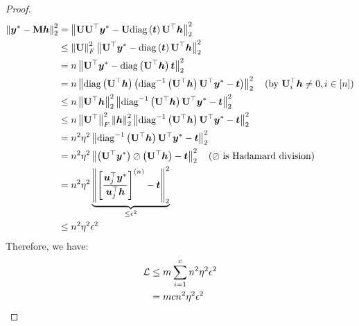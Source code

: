 \documentclass{article} %
\begin{document}
\begin{proof}
		\begin{equation}
			\begin{aligned}
				\left\|{\bm{y}}^*-{\mathbf{M}}{\bm{h}}\right\|^2_2&=\left\|{\mathbf{U}}{\mathbf{U}}^{\top}{\bm{y}}^*-{\mathbf{U}}\mathrm{diag}\left({\bm{t}}\right){\mathbf{U}}^{\top}{\bm{h}}\right\|_2^2\\
				&\leq\left\|{\mathbf{U}}\right\|_F^2\left\|{\mathbf{U}}^{\top}{\bm{y}}^*-\mathrm{diag}\left({\bm{t}}\right){\mathbf{U}}^{\top}{\bm{h}}\right\|_2^2\\
				&=n\left\|{\mathbf{U}}^{\top}{\bm{y}}^*-\mathrm{diag}\left({\mathbf{U}}^{\top}{\bm{h}}\right){\bm{t}}\right\|_2^2\\
				&=n\left\|\mathrm{diag}\left({\mathbf{U}}^{\top}{\bm{h}}\right)\left(\mathrm{diag}^{-1}\left({\mathbf{U}}^{\top}{\bm{h}}\right){\mathbf{U}}^{\top}{\bm{y}}^*-{\bm{t}}\right)\right\|_2^2\quad\textrm{(by ${\mathbf{U}}_i^{\top}{\bm{h}}\neq 0,i\in[n])$}\\
				&\leq n\left\|{\mathbf{U}}^{\top}{\bm{h}}\right\|_2^2\left\|\mathrm{diag}^{-1}\left({\mathbf{U}}^{\top}{\bm{h}}\right){\mathbf{U}}^{\top}{\bm{y}}^*-{\bm{t}}\right\|_2^2\\
				&\leq n\left\|{\mathbf{U}}^{\top}\right\|_F^2\left\|{\bm{h}}\right\|_2^2\left\|\mathrm{diag}^{-1}\left({\mathbf{U}}^{\top}{\bm{h}}\right){\mathbf{U}}^{\top}{\bm{y}}^*-{\bm{t}}\right\|_2^2\\
				&=n^2\eta^2\left\|\mathrm{diag}^{-1}\left({\mathbf{U}}^{\top}{\bm{h}}\right){\mathbf{U}}^{\top}{\bm{y}}^*-{\bm{t}}\right\|_2^2\\
				&=n^2\eta^2\left\|\left({\mathbf{U}}^{\top}{\bm{y}}^*\right)\oslash\left({\mathbf{U}}^{\top}{\bm{h}}\right)-{\bm{t}}\right\|_2^2\quad\textrm{($\oslash$ is Hadamard division)}\\
				&=n^2\eta^2\underbrace{\left\|\left[\frac{{\bm{u}}_j^{\top}{\bm{y}}^*}{{\bm{u}}_j^{\top}{\bm{h}}}\right]^{(n)}-{\bm{t}}\right\|_2^2}_{\leq\epsilon^2}\\
				&\leq n^2\eta^2\epsilon^2
			\end{aligned}
		\end{equation}
		Therefore, we have:
		\begin{equation}
			\begin{aligned}
				{\mathcal{L}}&\leq m\sum_{i=1}^c n^2\eta^2\epsilon^2\\
				&=mcn^2\eta^2\epsilon^2
			\end{aligned}
		\end{equation}
	\end{proof}
	
\end{document}
